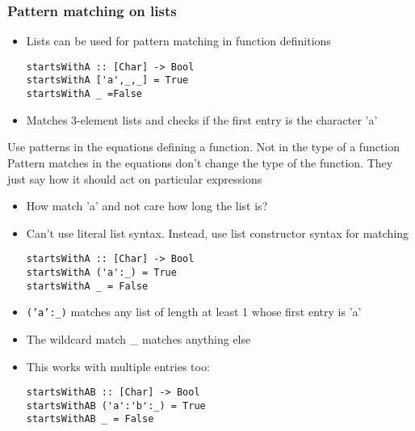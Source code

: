 \documentclass{article}[18pt]
\begin{document}
\subsubsection{Pattern matching on lists}
\begin{itemize}
	\item Lists can be used for pattern matching in function definitions
\begin{verbatim}
startsWithA :: [Char] -> Bool
startsWithA ['a',_,_] = True
startsWithA _ =False
\end{verbatim}
	\item Matches 3-element lists and checks if the first entry is the character 'a'
\end{itemize}
\begin{important}
Use patterns in the equations defining a function. Not in the type of a function\\
Pattern matches in the equations don't change the type of the function. They just say how it should act on particular expressions
\end{important}
\begin{itemize}
	\item How match 'a' and not care how long the list is?
	\item Can't use literal list syntax. Instead, use list constructor syntax for matching
\begin{verbatim}
startsWithA :: [Char] -> Bool
startsWithA ('a':_) = True
startsWithA _ = False
\end{verbatim}
	\item \texttt{('a':_)} matches any list of length at least 1 whose first entry is 'a'
	\item The wildcard match \_ matches anything else
	\item This works with multiple entries too:
\begin{verbatim}
startsWithAB :: [Char] -> Bool
startsWithAB ('a':'b':_) = True
startsWithAB _ = False
\end{verbatim}
\end{itemize}
\end{document}
